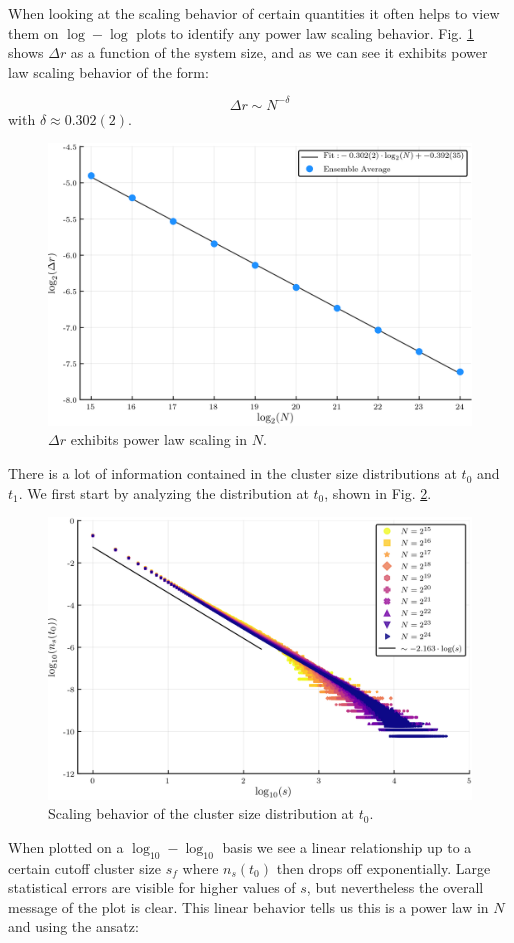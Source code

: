 When looking at the scaling behavior of certain quantities it often helps to view them on $\log-\log$ plots to identify any power law scaling behavior.
Fig. \ref{fig:delta_r_scaling} shows $\Delta r$ as a function of the system size, and as we can see it exhibits power law scaling behavior of the form:

\begin{equation}
	\Delta r \sim N^{-\delta}
\end{equation}
with $\delta \approx 0.302(2)$.

\begin{figure}[H]
	\centering
	\includegraphics[width=350pt, clip]{images/delta_r_scaling.png}
	\caption{$\Delta r$ exhibits power law scaling in $N$.}
	\label{fig:delta_r_scaling}
\end{figure}

There is a lot of information contained in the cluster size distributions at $t_0$ and $t_1$.
We first start by analyzing the distribution at $t_0$, shown in Fig. \ref{fig:n_s_t_0}.

\begin{figure}[H]
	\centering
	\includegraphics[width=350pt, clip]{images/n_s_t_0.png}
	\caption{Scaling behavior of the cluster size distribution at $t_0$.}
	\label{fig:n_s_t_0}
\end{figure}
When plotted on a $\log_{10}-\log_{10}$ basis we see a linear relationship up to a certain cutoff cluster size $s_f$ where $n_s(t_0)$ then drops off exponentially.
Large statistical errors are visible for higher values of $s$, but nevertheless the overall message of the plot is clear.
This linear behavior tells us this is a power law in $N$ and using the ansatz:

